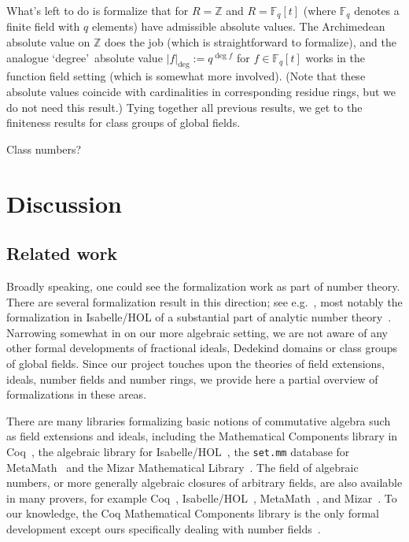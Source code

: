 \documentclass[a4paper,USenglish,cleveref, autoref, thm-restate]{lipics-v2021}
\newcommand{\Z}{\mathbb{Z}}
\begin{document}
What's left to do is formalize that for $R=\Z$ and $R=\mathbb{F}_q[t]$ (where $\mathbb{F}_q$ denotes a finite field with $q$ elements) have admissible absolute values. The Archimedean absolute value on $\Z$ does the job (which is straightforward to formalize), and the analogue \lq degree\rq\ absolute value $|f|_{\deg}:=q^{\deg f}$ for $f \in \mathbb{F}_q[t]$ works in the function field setting (which is somewhat more involved). (Note that these absolute values coincide with cardinalities in corresponding residue rings, but we do not need this result.)
Tying together all previous results, we get to the finiteness results for class groups of global fields.

Class numbers?


\section{Discussion}

\subsection{Related work}

Broadly speaking, one could see the formalization work as part of number theory. There are several formalization result in this direction; see e.g.~\cite[Section 6]{CapSetProblem}, most notably the formalization in Isabelle/HOL of a substantial part of analytic number theory~\cite{Eberl19}.
Narrowing somewhat in on our more algebraic setting, we are not aware of any other formal developments of fractional ideals, Dedekind domains or class groups of global fields.
Since our project touches upon the theories of field extensions, ideals, number fields and number rings,
we provide here a partial overview of formalizations in these areas.

There are many libraries formalizing basic notions of commutative algebra such as field extensions and ideals, including the Mathematical Components library in Coq~\cite{mathcomp}, the algebraic library for Isabelle/HOL~\cite{algebra_isabelle}, the \texttt{set.mm} database for MetaMath~\cite{metamath} and the Mizar Mathematical Library~\cite{algebraic-hierarchy_mizar}. The field of algebraic numbers, or more generally algebraic closures of arbitrary fields, are also available in many provers, for example Coq~\cite{real-algebraic-numbers-coq, mathcomp}, Isabelle/HOL~\cite{algebraic-numbers-isabelle}, MetaMath~\cite{algebraic-numbers-metamath}, and Mizar~\cite{algebraic-numbers-mizar}. To our knowledge, the Coq Mathematical Components library is the only formal development except ours specifically dealing with number fields~\cite[\texttt{field/algnum.v}]{mathcomp}.
\end{document}
